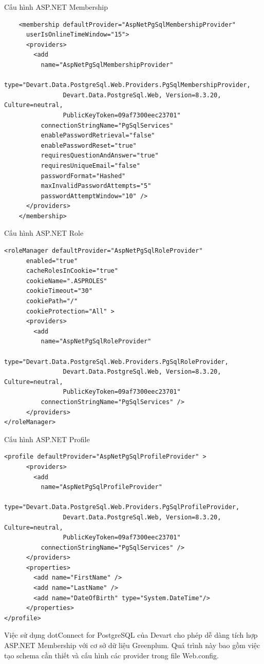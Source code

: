 \documentclass[14pt]{article}
\begin{document}
Cấu hình ASP.NET Membership
\begin{verbatim}
    <membership defaultProvider="AspNetPgSqlMembershipProvider"
      userIsOnlineTimeWindow="15">
      <providers>
        <add
          name="AspNetPgSqlMembershipProvider"
          type="Devart.Data.PostgreSql.Web.Providers.PgSqlMembershipProvider,
                Devart.Data.PostgreSql.Web, Version=8.3.20, Culture=neutral, 
                PublicKeyToken=09af7300eec23701"
          connectionStringName="PgSqlServices"
          enablePasswordRetrieval="false"
          enablePasswordReset="true"
          requiresQuestionAndAnswer="true"
          requiresUniqueEmail="false"
          passwordFormat="Hashed"
          maxInvalidPasswordAttempts="5"
          passwordAttemptWindow="10" />
      </providers>
    </membership>
\end{verbatim}

Cấu hình ASP.NET Role
\begin{verbatim}
<roleManager defaultProvider="AspNetPgSqlRoleProvider"
      enabled="true"
      cacheRolesInCookie="true"
      cookieName=".ASPROLES"
      cookieTimeout="30"
      cookiePath="/"
      cookieProtection="All" >
      <providers>
        <add
          name="AspNetPgSqlRoleProvider"
          type="Devart.Data.PostgreSql.Web.Providers.PgSqlRoleProvider,
                Devart.Data.PostgreSql.Web, Version=8.3.20, Culture=neutral, 
                PublicKeyToken=09af7300eec23701"
          connectionStringName="PgSqlServices" />
      </providers>
</roleManager>
\end{verbatim}

Cấu hình ASP.NET Profile 
\begin{verbatim}
<profile defaultProvider="AspNetPgSqlProfileProvider" >
      <providers>
        <add
          name="AspNetPgSqlProfileProvider"
          type="Devart.Data.PostgreSql.Web.Providers.PgSqlProfileProvider,
                Devart.Data.PostgreSql.Web, Version=8.3.20, Culture=neutral, 
                PublicKeyToken=09af7300eec23701"
          connectionStringName="PgSqlServices" />
      </providers>
      <properties>
        <add name="FirstName" />
        <add name="LastName" />
        <add name="DateOfBirth" type="System.DateTime"/>
      </properties>
</profile>
\end{verbatim}

Việc sử dụng dotConnect for PostgreSQL của Devart cho phép dễ dàng tích hợp ASP.NET Membership với cơ sở dữ liệu Greenplum. Quá trình này bao gồm việc tạo schema cần thiết và cấu hình các provider trong file Web.config.
\end{document}
